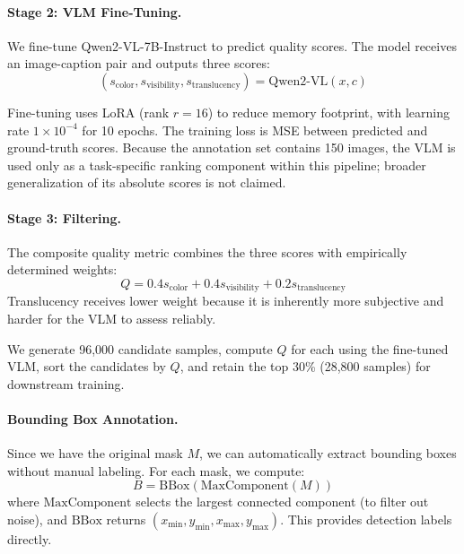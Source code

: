 \documentclass[journal]{IEEEtran}
\begin{document}
\paragraph{Stage 2: VLM Fine-Tuning.}
We fine-tune Qwen2-VL-7B-Instruct \cite{wang2024qwen2vlenhancingvisionlanguagemodels} to predict quality scores. The model receives an image-caption pair and outputs three scores:
\begin{equation}
(s_{\text{color}}, s_{\text{visibility}}, s_{\text{translucency}}) = \text{Qwen2-VL}(x, c)
\end{equation}

Fine-tuning uses LoRA \cite{hu2021loralowrankadaptationlarge} (rank $r=16$) to reduce memory footprint, with learning rate $1\times10^{-4}$ for 10 epochs. The training loss is MSE between predicted and ground-truth scores. Because the annotation set contains 150 images, the VLM is used only as a task-specific ranking component within this pipeline; broader generalization of its absolute scores is not claimed.

\paragraph{Stage 3: Filtering.}
The composite quality metric combines the three scores with empirically determined weights:
\begin{equation}
Q = 0.4 s_{\text{color}} + 0.4 s_{\text{visibility}} + 0.2 s_{\text{translucency}}
\label{eq:quality}
\end{equation}
Translucency receives lower weight because it is inherently more subjective and harder for the VLM to assess reliably.

We generate 96,000 candidate samples, compute $Q$ for each using the fine-tuned VLM, sort the candidates by $Q$, and retain the top 30\% (28,800 samples) for downstream training.

\paragraph{Bounding Box Annotation.}
Since we have the original mask $M$, we can automatically extract bounding boxes without manual labeling. For each mask, we compute:
\begin{equation}
B = \text{BBox}(\text{MaxComponent}(M))
\end{equation}
where $\text{MaxComponent}$ selects the largest connected component (to filter out noise), and $\text{BBox}$ returns $(x_{\min}, y_{\min}, x_{\max}, y_{\max})$. This provides detection labels directly.
\end{document}
